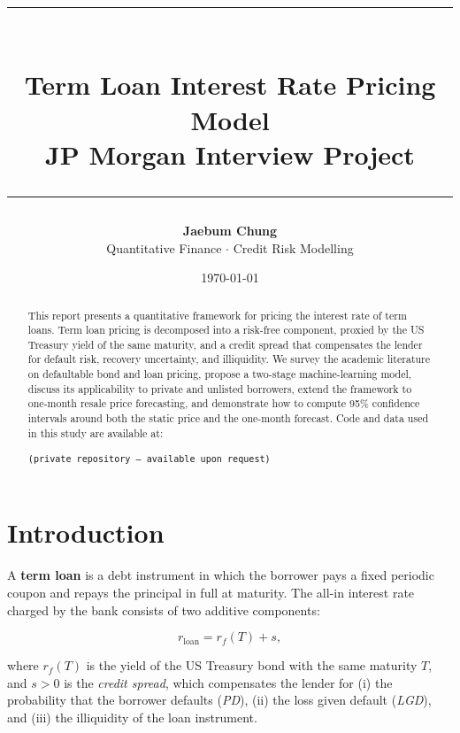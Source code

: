 \documentclass[12pt, a4paper]{article}
\title{
  \vspace{-1cm}
  {\color{jpmblue}\rule{\linewidth}{2pt}}\\[0.4cm]
  {\Large\bfseries\color{jpmblue} Term Loan Interest Rate Pricing Model}\\[0.2cm]
  {\large\color{jpmgold} JP Morgan Interview Project}\\[0.3cm]
  {\color{jpmblue}\rule{\linewidth}{0.8pt}}
}
\author{
  \textbf{Jaebum Chung} \\
  \small Quantitative Finance $\cdot$ Credit Risk Modelling
}
\date{\today}
\theoremstyle{definition}
\begin{document}

\maketitle
\thispagestyle{fancy}

\begin{abstract}
\noindent
This report presents a quantitative framework for pricing the interest rate of term loans.
Term loan pricing is decomposed into a risk-free component, proxied by the US Treasury yield
of the same maturity, and a credit spread that compensates the lender for default risk,
recovery uncertainty, and illiquidity.
We survey the academic literature on defaultable bond and loan pricing, propose a
two-stage machine-learning model, discuss its applicability to private and unlisted
borrowers, extend the framework to one-month resale price forecasting, and demonstrate
how to compute 95\% confidence intervals around both the static price and the
one-month forecast.
Code and data used in this study are available at:
\begin{center}
  \texttt{(private repository --- available upon request)}
\end{center}
\end{abstract}

\tableofcontents
\newpage

\section{Introduction}

A \textbf{term loan} is a debt instrument in which the borrower pays a fixed periodic
coupon and repays the principal in full at maturity.
The all-in interest rate charged by the bank consists of two additive components:

\begin{equation}
  r_{\text{loan}} = r_f(T) + s,
  \label{eq:allin}
\end{equation}

\noindent where $r_f(T)$ is the yield of the US Treasury bond with the same maturity $T$,
and $s > 0$ is the \emph{credit spread}, which compensates the lender for
(i) the probability that the borrower defaults (\textit{PD}),
(ii) the loss given default (\textit{LGD}), and
(iii) the illiquidity of the loan instrument.
\end{document}
